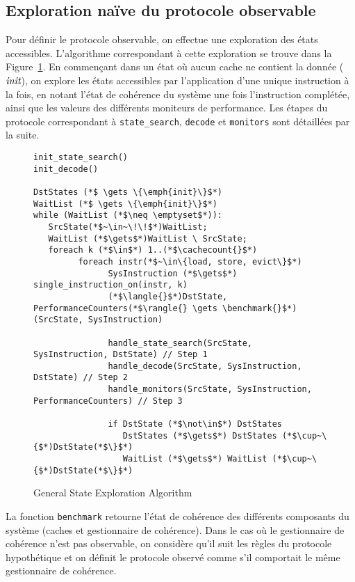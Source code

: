 \subsection{Exploration naïve du protocole observable}
Pour définir le protocole observable, on effectue une exploration des états
accessibles. L'algorithme correspondant à cette exploration se trouve dans
la Figure~\ref{fr:fig:identification:state_exploration}. En commençant dans un
état où aucun cache ne contient la donnée ($\emph{init}$), on explore les états
accessibles par l'application d'une unique instruction à la fois, en notant
l'état de cohérence du système une fois l'instruction complétée, ainsi que les
valeurs des différents moniteurs de performance. Les étapes du protocole
correspondant à \lstinline!state_search!, \lstinline!decode! et
\lstinline!monitors! sont détaillées par la suite.

\begin{figure}[hbt!]
\begin{lstlisting}
init_state_search()
init_decode()

DstStates (*$ \gets \{\emph{init}\}$*)
WaitList (*$ \gets \{\emph{init}\}$*)
while (WaitList (*$\neq \emptyset$*)):
   SrcState(*$~\in~\!\!$*)WaitList;
   WaitList (*$\gets$*)WaitList \ SrcState;
   foreach k (*$\in$*) 1..(*$\cachecount{}$*)
         foreach instr(*$~\in\{load, store, evict\}$*)
               SysInstruction (*$\gets$*) single_instruction_on(instr, k)
               (*$\langle{}$*)DstState, PerformanceCounters(*$\rangle{} \gets \benchmark{}$*)(SrcState, SysInstruction)

               handle_state_search(SrcState, SysInstruction, DstState) // Step 1
               handle_decode(SrcState, SysInstruction, DstState) // Step 2
               handle_monitors(SrcState, SysInstruction, PerformanceCounters) // Step 3

               if DstState (*$\not\in$*) DstStates
                  DstStates (*$\gets$*) DstStates (*$\cup~\{$*)DstState(*$\}$*)
                  WaitList (*$\gets$*) WaitList (*$\cup~\{$*)DstState(*$\}$*)
\end{lstlisting}
\caption{General State Exploration Algorithm}
\label{fr:fig:identification:state_exploration}
\end{figure}

La fonction \lstinline!benchmark! retourne l'état de cohérence des différents
composants du système (caches et gestionnaire de cohérence). Dans le cas où le
gestionnaire de cohérence n'est pas observable, on considère qu'il suit les
règles du protocole hypothétique et on définit le protocole observé comme s'il
comportait le même gestionnaire de cohérence.

